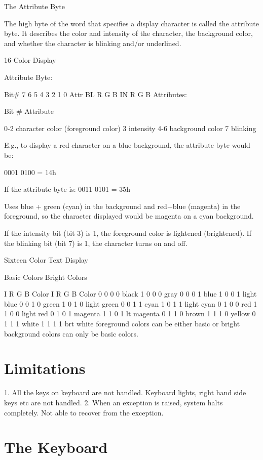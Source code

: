 \documentclass[11pt]{article}
\begin{document}
The Attribute Byte

The high byte of the word that specifies a display character is called the attribute byte. It describes the color and intensity of the character, the background color, and whether the character is blinking and/or underlined.

16-Color Display

Attribute Byte:

Bit\#	7	6	5	4	3	2	1	0
Attr	BL	R	G	B	IN	R	G	B
Attributes:

     Bit \#    Attribute

0-2      character color (foreground color)
3        intensity 
4-6      background color
7        blinking

E.g., to display a red character on a blue background, the attribute byte would be:

0001 0100 = 14h

If the attribute byte is: 0011 0101 = 35h

Uses blue + green (cyan) in the background and red+blue (magenta) in the foreground, so the character displayed would be magenta on a cyan background.

If the intensity bit (bit 3) is 1, the foreground color is lightened (brightened). If the blinking bit (bit 7) is 1, the character turns on and off.

Sixteen Color Text Display

Basic Colors                 Bright Colors

I R G B     Color      I R G B     Color 
0 0 0 0      black     1 0 0 0     gray
0 0 0 1      blue      1 0 0 1     light blue
0 0 1 0      green     1 0 1 0     light green
0 0 1 1      cyan      1 0 1 1     light cyan
0 1 0 0      red       1 1 0 0     light red
0 1 0 1      magenta   1 1 0 1     lt magenta
0 1 1 0      brown     1 1 1 0     yellow
0 1 1 1      white     1 1 1 1     brt white
foreground colors can be either basic or bright
background colors can only be basic colors.

\section {Limitations}

1. All the keys on keyboard are not handled. Keyboard lights, right hand side keys etc are not handled.
2. When an exception is raised, system halts completely. Not able to recover from the exception.

\section {The Keyboard}
\end{document}
